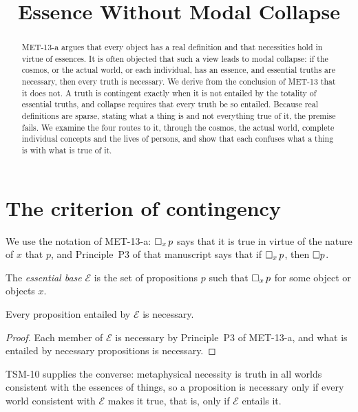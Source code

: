 \documentclass{situationist-preprint}
\title{Essence Without Modal Collapse}
\begin{document}
\maketitle

\begin{abstract}
MET-13-a argues that every object has a real definition and that necessities hold in virtue of essences. It is often objected that such a view leads to modal collapse: if the cosmos, or the actual world, or each individual, has an essence, and essential truths are necessary, then every truth is necessary. We derive from the conclusion of MET-13 that it does not. A truth is contingent exactly when it is not entailed by the totality of essential truths, and collapse requires that every truth be so entailed. Because real definitions are sparse, stating what a thing is and not everything true of it, the premise fails. We examine the four routes to it, through the cosmos, the actual world, complete individual concepts and the lives of persons, and show that each confuses what a thing is with what is true of it.
\end{abstract}

\section{The criterion of contingency}\label{s:criterion}

We use the notation of MET-13-a: $\mathord{\Box}_x\,p$ says that it is true in virtue of the nature of $x$ that $p$, and Principle~P3 of that manuscript says that if $\mathord{\Box}_x\,p$, then $\mathord{\Box} p$.

\begin{definition}\label{d:base}
The \emph{essential base} $\mathcal{E}$ is the set of propositions $p$ such that $\mathord{\Box}_x\,p$ for some object or objects $x$.
\end{definition}

\begin{lemma}\label{l:closure}
Every proposition entailed by $\mathcal{E}$ is necessary.
\end{lemma}

\begin{proof}
Each member of $\mathcal{E}$ is necessary by Principle~P3 of MET-13-a, and what is entailed by necessary propositions is necessary.
\end{proof}

TSM-10 supplies the converse: metaphysical necessity is truth in all worlds consistent with the essences of things, so a proposition is necessary only if every world consistent with $\mathcal{E}$ makes it true, that is, only if $\mathcal{E}$ entails it.
\end{document}

